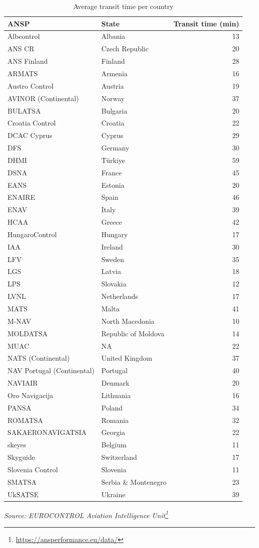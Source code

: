 \documentclass[
  11pt,
  a4paper,
]{book}
\DeclareRobustCommand{\href}[2]{#2\footnote{\url{#1}}}
\begin{document}
\hypertarget{tbl-transit-time}{}
\setlength{\LTpost}{0mm}
\begin{longtable}{llr}
\caption{\label{tbl-transit-time}Average transit time per country }\tabularnewline

\toprule
ANSP & State & Transit time (min) \\ 
\midrule
Albcontrol & Albania & 13 \\ 
ANS CR & Czech Republic & 20 \\ 
ANS Finland & Finland & 28 \\ 
ARMATS & Armenia & 16 \\ 
Austro Control & Austria & 19 \\ 
AVINOR (Continental) & Norway & 37 \\ 
BULATSA & Bulgaria & 20 \\ 
Croatia Control & Croatia & 22 \\ 
DCAC Cyprus & Cyprus & 29 \\ 
DFS & Germany & 30 \\ 
DHMI & Türkiye & 59 \\ 
DSNA & France & 45 \\ 
EANS & Estonia & 20 \\ 
ENAIRE & Spain & 46 \\ 
ENAV & Italy & 39 \\ 
HCAA & Greece & 42 \\ 
HungaroControl & Hungary & 17 \\ 
IAA & Ireland & 30 \\ 
LFV & Sweden & 35 \\ 
LGS & Latvia & 18 \\ 
LPS & Slovakia & 12 \\ 
LVNL & Netherlands & 17 \\ 
MATS & Malta & 41 \\ 
M-NAV & North Macedonia & 10 \\ 
MOLDATSA & Republic of Moldova & 14 \\ 
MUAC & NA & 22 \\ 
NATS (Continental) & United Kingdom & 37 \\ 
NAV Portugal (Continental) & Portugal & 40 \\ 
NAVIAIR & Denmark & 20 \\ 
Oro Navigacija & Lithuania & 16 \\ 
PANSA & Poland & 34 \\ 
ROMATSA & Romania & 32 \\ 
SAKAERONAVIGATSIA & Georgia & 22 \\ 
skeyes & Belgium & 11 \\ 
Skyguide & Switzerland & 17 \\ 
Slovenia Control & Slovenia & 11 \\ 
SMATSA & Serbia \& Montenegro & 23 \\ 
UkSATSE & Ukraine & 39 \\ 
\bottomrule
\end{longtable}
\begin{minipage}{\linewidth}
\emph{Source: \href{https://ansperformance.eu/data/}{EUROCONTROL Aviation Intelligence Unit}}\\
\end{minipage}
\end{document}
